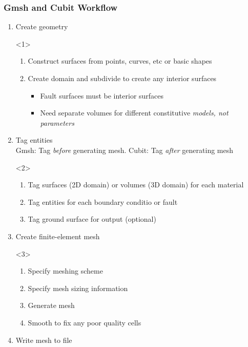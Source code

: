\documentclass[aspectratio=169]{beamer}
\begin{document}
\begin{frame}[t]
  \frametitle{Gmsh and Cubit Workflow}
  \summary{}

  \begin{enumerate}
  \item Create geometry
    \begin{onlyenv}<1>
      \begin{enumerate}
      \item Construct surfaces from points, curves, etc or basic shapes
      \item Create domain and subdivide to create any interior surfaces
        \begin{itemize}
        \item Fault surfaces must be interior surfaces
        \item Need separate volumes for different constitutive {\em models, not parameters}
        \end{itemize}
      \end{enumerate}
    \end{onlyenv}
  \item Tag entities\\
    Gmsh: Tag {\em before} generating mesh. Cubit: Tag {\em after} generating mesh
    \begin{onlyenv}<2>
      \begin{enumerate}
      \item Tag surfaces (2D domain) or volumes (3D domain) for each material
      \item Tag entities for each boundary conditio or fault
      \item Tag ground surface for output (optional)
      \end{enumerate}
    \end{onlyenv}
  \item Create finite-element mesh
    \begin{onlyenv}<3>
      \begin{enumerate}
      \item Specify meshing scheme
      \item Specify mesh sizing information
      \item Generate mesh
      \item Smooth to fix any poor quality cells
      \end{enumerate}
    \end{onlyenv}
  \item Write mesh to file
  \end{enumerate}

\end{frame}
\end{document}
